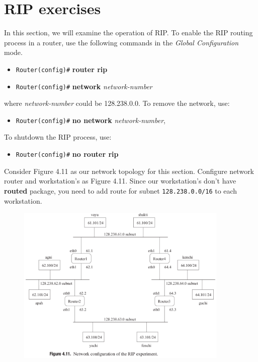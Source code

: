 \documentclass{../UTNetLab}
\begin{document}
\section*{RIP exercises}
    In this section, we will examine the operation of RIP. To enable the RIP routing process in a router, use the following commands in the \textit{Global Configuration} mode.
    \begin{itemize}
        \item \texttt{Router(config)\#} \textbf{router rip}
        \item \texttt{Router(config)\#} \textbf{network} \textit{network-number}
    \end{itemize}
    where \textit{network-number} could be 128.238.0.0. To remove the network, use:
    \begin{itemize}
        \item \texttt{Router(config)\#} \textbf{no network} \textit{network-number},
    \end{itemize}
    To shutdown the RIP process, use:
    \begin{itemize}
        \item \texttt{Router(config)\#} \textbf{no router rip}
    \end{itemize}
    Consider Figure 4.11 as our network topology for this section.
    Configure network router and workstation’s as Figure 4.11. Since our workstation’s don’t have \textbf{routed} package, you need to add route for subnet \texttt{128.238.0.0/16} to each workstation.
    \begin{figure}[H]
        \centering
        \includegraphics[width=0.9\textwidth]{img/figure4-11.png}
    \end{figure}
\end{document}

